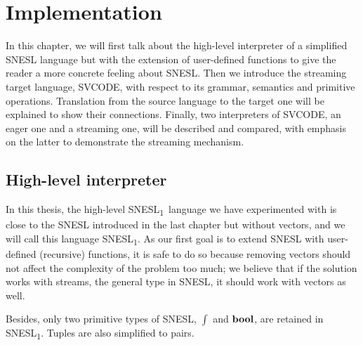 
\newcommand\tr{\triangleright}
\newcommand{\proc}{\*{Proc}}
\newcommand{\bufst}{\*{BufState}}
\newcommand{\sups}{\*{Sups}}
\newcommand{\clis}{\*{Clis}}
\newcommand{\xducer}{\*{Xducer}}
\newcommand{\filling}{\texttt{Filling} \ }
\newcommand{\draining}{\texttt{Draining} \ }
\newcommand{\pin}{ \texttt{Pin} \ }
\newcommand{\pout}{\texttt{Pout}}
\newcommand{\done}{\texttt{Done}}

\newcommand{\ftype}{\varphi}

\newcommand\mysnesl{SNESL\textsubscript{1}}

\def\interT#1#2#3{\vdash_{#1} #2 : #3}
\def\conc#1{#1 \ {\mathbf{concrete}}}

\chapter{Implementation}

\def\Type#1#2#3{#1 \vdash_{\Sigma} \ #2 : #3 } 
\def\Eval#1#2#3{#1 \vdash_{\Phi} #2 \Eva #3 } 

In this chapter, we will first talk about the high-level interpreter of a simplified SNESL language but with the extension of user-defined functions to give the reader a more concrete feeling about SNESL. 
Then we introduce the streaming target language, SVCODE, with respect to its grammar, semantics and primitive operations.
Translation from the source language to the target one will be explained to show their connections.
Finally, two interpreters of SVCODE, an eager one and a streaming one, will be described and compared, with emphasis on the latter to demonstrate the streaming mechanism.



\section{High-level interpreter}


In this thesis, the high-level \mysnesl \ language we have experimented with is close to the SNESL introduced in the last chapter but without vectors, and we will call this language \mysnesl.
As our first goal is to extend SNESL with user-defined (recursive) functions,
it is safe to do so because removing vectors should not affect the complexity of the problem too much; we believe that if the solution works with streams, the general type in SNESL, it should work with vectors as well. 

Besides, only two primitive types of SNESL, $\int$ and $\mathbf{bool}$, are retained in \mysnesl. 
Tuples are also simplified to pairs.  

